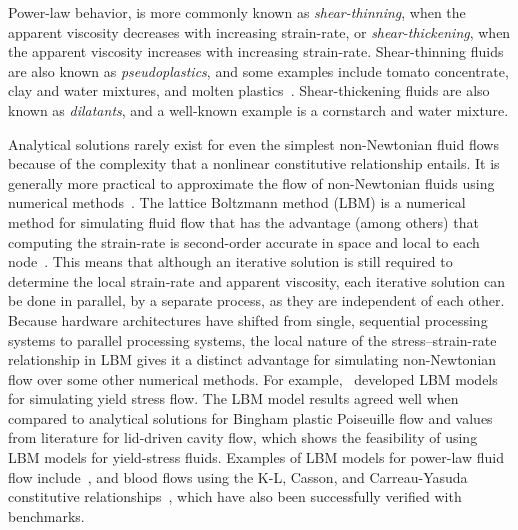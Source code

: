 Power-law behavior, is more commonly known as \emph{shear-thinning}, when the apparent viscosity decreases with increasing strain-rate, or \emph{shear-thickening}, when the apparent viscosity increases with increasing strain-rate.
Shear-thinning fluids are also known as \emph{pseudoplastics}, and some examples include tomato concentrate, clay and water mixtures, and molten plastics~\cite{irgens2014rheology}.
Shear-thickening fluids are also known as \emph{dilatants}, and a well-known example is a cornstarch and water mixture.

\label{sec:lbm-for-nnf}

Analytical solutions rarely exist for even the simplest non-Newtonian fluid flows because of the complexity that a nonlinear constitutive relationship entails.
It is generally more practical to approximate the flow of non-Newtonian fluids using numerical methods~\cite{syrakos2014performance,owens2002computational,chai2011multiple}.
The lattice Boltzmann method (LBM) is a numerical method for simulating fluid flow that has the advantage (among others) that computing the strain-rate is second-order accurate in space and local to each node~\cite{kruger2010second}.
This means that although an iterative solution is still required to determine the local strain-rate and apparent viscosity, each iterative solution can be done in parallel, by a separate process, as they are independent of each other.
Because hardware architectures have shifted from single, sequential processing systems to parallel processing systems, the local nature of the stress--strain-rate relationship in LBM gives it a distinct advantage for simulating non-Newtonian flow over some other numerical methods.
For example,~\cite{tang2011bingham,chai2011multiple,fallah2012multiple,chen2014simulations,vikhansky2008lattice,wang2008lattice} developed LBM models for simulating yield stress flow.
The LBM model results agreed well when compared to analytical solutions for Bingham plastic Poiseuille flow and values from literature for lid-driven cavity flow, which shows the feasibility of using LBM models for yield-stress fluids.
Examples of LBM models for power-law fluid flow include~\cite{wang2011lattice,wang2015localized,boyd2006second,chai2011multiple}, and blood flows using the K-L, Casson, and Carreau-Yasuda constitutive relationships~\cite{ashrafizaadeh2009comparison}, which have also been successfully verified with benchmarks.

